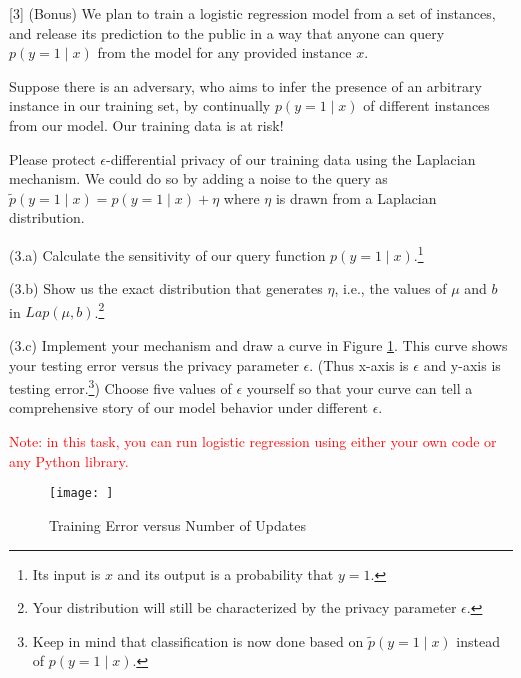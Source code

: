 \documentclass{llncs}
\begin{document}
\newpage 

[3] (Bonus) We plan to train a logistic regression 
model from a set of instances, and release its
prediction to the public in a way that anyone can 
query $p(y = 1 \mid x)$ from the model for any 
provided instance $x$. 

Suppose there is an adversary, who aims to infer 
the presence of an arbitrary instance in our training 
set, by continually $p(y = 1 \mid x)$ of different 
instances from our model. Our training data is at risk! 

Please protect $\epsilon$-differential privacy of 
our training data using the Laplacian mechanism.
We could do so by adding a noise to the query as 
$\tilde{p}(y = 1 \mid x) = p(y = 1 \mid x) + \eta$ 
where $\eta$ is drawn from a Laplacian distribution. 

(3.a) Calculate the sensitivity of our query 
function $p(y = 1 \mid x)$.\footnote{Its input is 
$x$ and its output is a probability that $y = 1$.} 

(3.b) Show us the exact distribution that 
generates $\eta$, i.e., the values 
of $\mu$ and $b$ in $Lap(\mu, b)$.\footnote{Your 
distribution will still be characterized by the 
privacy parameter $\epsilon$.}  

(3.c) Implement your mechanism and draw 
a curve in Figure \ref{hw12_fig2}. 
This curve shows your testing error 
versus the privacy parameter $\epsilon$. (Thus x-axis 
is $\epsilon$ and y-axis is testing error.\footnote{Keep 
in mind that classification is now done based on 
$\tilde{p}(y=1 \mid x)$ instead of $p(y=1 \mid x)$.}) 
Choose five 
values of $\epsilon$ yourself so that your curve can 
tell a comprehensive story of our model behavior under 
different $\epsilon$. 

\textcolor{red}{Note: in this task, 
you can run logistic regression using either 
your own code or any Python library.}

\begin{figure}[h!] 
\centering 
\texttt{[image: ]} 
\caption{Training Error versus 
Number of Updates} 
\label{hw12_fig2}
\end{figure}
\end{document}
